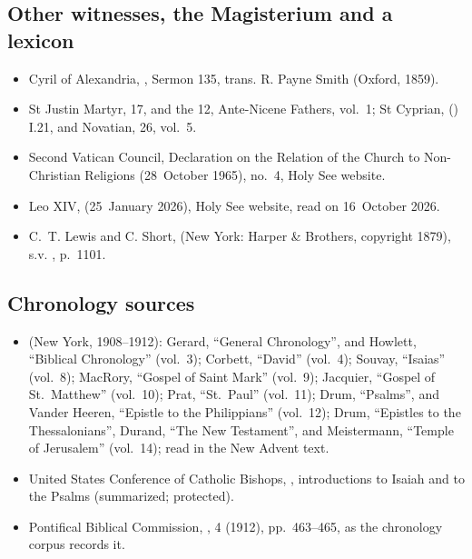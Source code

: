 {\subsection*{Other witnesses, the Magisterium and a lexicon}
\begin{itemize}\setlength{\itemsep}{0.15em}\setlength{\parskip}{0pt}
\item Cyril of Alexandria, , Sermon 135, trans. R. Payne Smith (Oxford, 1859).
\item St Justin Martyr,  17, and the  12, Ante-Nicene Fathers, vol.~1; St Cyprian,  () I.21, and Novatian,  26, vol.~5.
\item Second Vatican Council, Declaration on the Relation of the Church to Non-Christian Religions  (28~October 1965), no.~4, Holy See website.
\item Leo XIV,  (25~January 2026), Holy See website, read on 16~October 2026.
\item C.~T. Lewis and C. Short,  (New York: Harper \& Brothers, copyright 1879), s.v. , p.~1101.
\end{itemize}

\subsection*{Chronology sources}
\begin{itemize}\setlength{\itemsep}{0.15em}\setlength{\parskip}{0pt}
\item {} (New York, 1908--1912): Gerard, ``General Chronology'', and Howlett, ``Biblical Chronology'' (vol.~3); Corbett, ``David'' (vol.~4); Souvay, ``Isaias'' (vol.~8); MacRory, ``Gospel of Saint Mark'' (vol.~9); Jacquier, ``Gospel of St.~Matthew'' (vol.~10); Prat, ``St.~Paul'' (vol.~11); Drum, ``Psalms'', and Vander Heeren, ``Epistle to the Philippians'' (vol.~12); Drum, ``Epistles to the Thessalonians'', Durand, ``The New Testament'', and Meistermann, ``Temple of Jerusalem'' (vol.~14); read in the New Advent text.
\item United States Conference of Catholic Bishops, , introductions to Isaiah and to the Psalms (summarized; protected).
\item Pontifical Biblical Commission, ,  4 (1912), pp.~463--465, as the chronology corpus records it.
\end{itemize}
\par}
